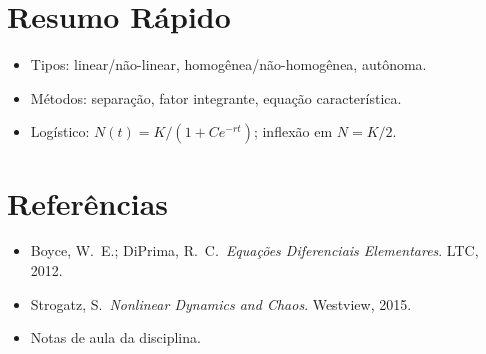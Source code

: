 \documentclass[12pt,a4paper]{article}
\begin{document}
\section*{Resumo R\'apido}
\begin{itemize}
  \item Tipos: linear/n\~ao-linear, homog\^enea/n\~ao-homog\^enea, aut\^onoma.
  \item M\'etodos: separa\c{c}\~ao, fator integrante, equa\c{c}\~ao caracter\'istica.
  \item Log\'istico: $N(t) = K/(1 + Ce^{-rt})$; inflex\~ao em $N=K/2$.
\end{itemize}

\section*{Refer\^encias}
\begin{itemize}
  \item Boyce, W.\ E.; DiPrima, R.\ C.\ \textit{Equa\c{c}\~oes Diferenciais Elementares}. LTC, 2012.
  \item Strogatz, S.\ \textit{Nonlinear Dynamics and Chaos}. Westview, 2015.
  \item Notas de aula da disciplina.
\end{itemize}
\end{document}
